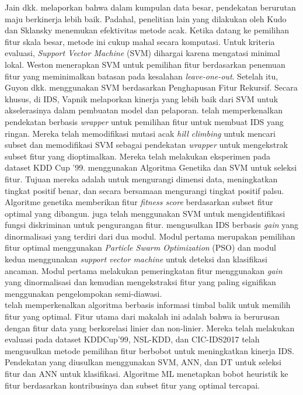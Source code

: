 \documentclass[conference]{IEEEtran}
\begin{document}
Jain dkk. \cite{jain1997feature} melaporkan bahwa dalam kumpulan data besar, pendekatan berurutan maju berkinerja lebih baik. Padahal, penelitian lain yang dilakukan oleh Kudo dan Sklansky \cite{kudo2000comparison} menemukan efektivitas metode acak. Ketika datang ke pemilihan fitur skala besar, metode ini cukup mahal secara komputasi. Untuk kriteria evaluasi, \emph{Support Vector Machine} (SVM) dihargai karena mengatasi minimal lokal. Weston \cite{grandvalet2002adaptive} menerapkan SVM untuk pemilihan fitur berdasarkan penemuan fitur yang meminimalkan batasan pada kesalahan \emph{leave-one-out}. Setelah itu, Guyon dkk. \cite{guyon2002gene} menggunakan SVM berdasarkan Penghapusan Fitur Rekursif. Secara khusus, di IDS, Vapnik \cite{vapink1995nature} melaporkan kinerja yang lebih baik dari SVM untuk akselerasinya dalam pembuatan model dan pelaporan.
\cite{10.1016/j.cose.2009.01.001} telah memperkenalkan pendekatan berbasis \emph{wrapper} untuk pemilihan fitur untuk membuat IDS yang ringan. Mereka telah memodifikasi mutasi acak \emph{hill climbing} untuk mencari subset dan memodifikasi SVM sebagai pendekatan \emph{wrapper} untuk mengekstrak subset fitur yang dioptimalkan. Mereka telah melakukan eksperimen pada dataset KDD Cup '99.
\cite{7881798} menggunakan Algoritma Genetika dan SVM untuk seleksi fitur. Tujuan mereka adalah untuk mengurangi dimensi data, meningkatkan tingkat positif benar, dan secara bersamaan mengurangi tingkat positif palsu. Algoritme genetika memberikan fitur \emph{fitness score} berdasarkan subset fitur optimal yang dibangun.
\cite{7732199} juga telah menggunakan SVM untuk mengidentifikasi fungsi diskriminan untuk pengurangan fitur.
\cite{articleusha} mengusulkan IDS berbasis \emph{gain} yang dinormalisasi yang terdiri dari dua modul. Modul pertama merupakan pemilihan fitur optimal menggunakan \emph{Particle Swarm Optimization} (PSO) dan modul kedua menggunakan \emph{support vector machine} untuk deteksi dan klasifikasi ancaman. Modul pertama melakukan pemeringkatan fitur menggunakan \emph{gain} yang dinormalisasi dan kemudian mengekstraksi fitur yang paling signifikan menggunakan pengelompokan semi-diawasi.\\
\cite{7387736} telah memperkenalkan algoritma berbasis informasi timbal balik untuk memilih fitur yang optimal. Fitur utama dari makalah ini adalah bahwa ia berurusan dengan fitur data yang berkorelasi linier dan non-linier. Mereka telah melakukan evaluasi pada dataset KDDCup'99, NSL-KDD, dan CIC-IDS2017 \cite{aminanto2017weighted} telah mengusulkan metode pemilihan fitur berbobot untuk meningkatkan kinerja IDS. Pendekatan yang diusulkan menggunakan SVM, ANN, dan DT untuk seleksi fitur dan ANN untuk klasifikasi. Algoritme ML menetapkan bobot heuristik ke fitur berdasarkan kontribusinya dan subset fitur yang optimal tercapai.
\end{document}
